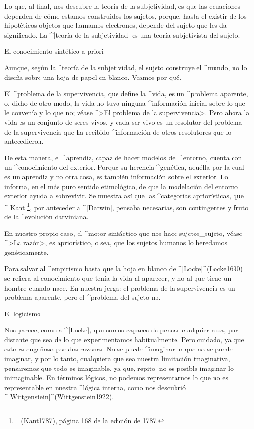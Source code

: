 
Lo que, al final, nos descubre la teoría de la subjetividad, es que las
ecuaciones dependen de cómo estamos construidos los sujetos, porque,
hasta el existir de los hipotéticos objetos que llamamos electrones,
depende del sujeto que les da significado. La ^|teoría de la
subjetividad| es una teoría subjetivista del sujeto.


\Section El conocimiento sintético a priori

Aunque, según la ^{teoría de la subjetividad}, el sujeto construye el
^{mundo}, no lo diseña sobre una hoja de papel en blanco. Veamos por
qué.

El ^{problema de la supervivencia}, que define la ^{vida}, es un
^{problema aparente}, o, dicho de otro modo, la vida no tuvo ninguna
^{información} inicial sobre lo que le convenía y lo que no; véase ^>El
problema de la supervivencia>. Pero ahora la vida es un conjunto de
seres vivos, y cada ser vivo es un resolutor del problema de la
supervivencia que ha recibido ^{información} de otros resolutores que lo
antecedieron.

De esta manera, el ^{aprendiz}, capaz de hacer modelos del ^{entorno},
cuenta con un ^{conocimiento}  del exterior. Porque su
herencia ^{genética}, aquélla por la cual es un aprendiz y no otra cosa,
es también información sobre el exterior. Lo informa, en el más puro
sentido etimológico, de que la modelación del entorno exterior ayuda a
sobrevivir. Se muestra así que las ^{categorías} apriorísticas, que
^[Kant]\footnote{_(Kant1787), página 168 de la edición de 1787.}, por
anteceder a ^[Darwin], pensaba necesarias, son contingentes y fruto de
la ^{evolución} darviniana.

En nuestro propio caso, el ^{motor sintáctico} que nos hace
sujetos_{sujeto}, véase ^>La razón>, es apriorístico, o sea,
que los sujetos humanos lo heredamos genéticamente.

Para salvar al ^{empirismo} basta que la hoja en blanco de
^[Locke]^(Locke1690) se refiera al conocimiento que tenía la vida al
aparecer, y no al que tiene un hombre cuando nace. En nuestra jerga: el
problema de la supervivencia es un problema aparente, pero el ^{problema
del sujeto} no.


\Section El logicismo

Nos parece, como a ^[Locke], que somos capaces de pensar cualquier cosa,
por distante que sea de lo que experimentamos habitualmente. Pero
cuidado, ya que esto es engañoso por dos razones.
\beginpoints
\point No se puede ^{imaginar} lo que no se puede imaginar, y por lo
tanto, cualquiera que sea nuestra limitación imaginativa, pensaremos que
todo es imaginable, ya que, repito, no es posible imaginar lo
inimaginable. En términos lógicos, no podemos representarnos lo que no
es representable en nuestra ^{lógica interna}, como nos descubrió
^[Wittgenstein]^(Wittgenstein1922).

